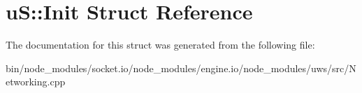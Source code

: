 \hypertarget{structu_s_1_1_init}{}\section{uS\+:\+:Init Struct Reference}
\label{structu_s_1_1_init}


The documentation for this struct was generated from the following file\+:\begin{DoxyCompactItemize}
\item 
bin/node\+\_\+modules/socket.\+io/node\+\_\+modules/engine.\+io/node\+\_\+modules/uws/src/Networking.\+cpp\end{DoxyCompactItemize}
